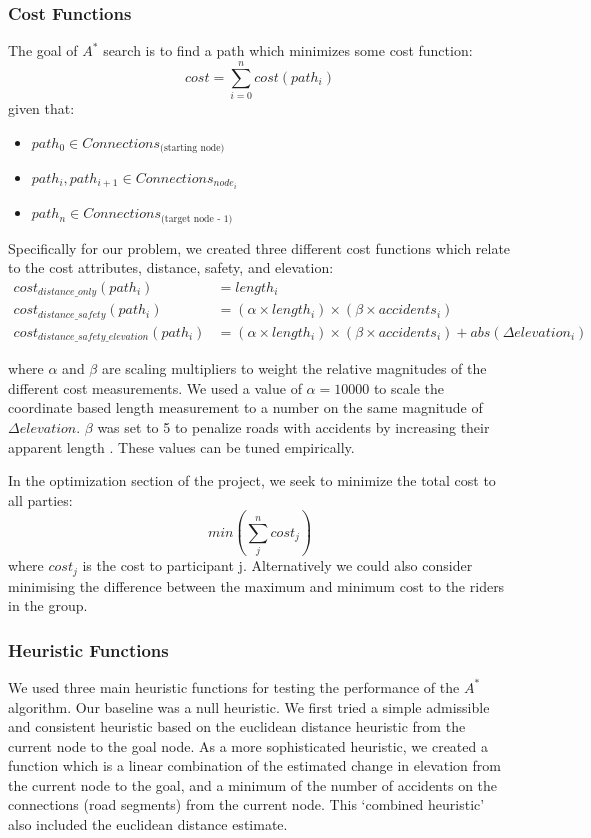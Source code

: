 \documentclass[11pt]{article}
\begin{document}
\subsubsection{Cost Functions}
The goal of $A^{*}$ search is to find a path which minimizes some cost function:
\begin{equation}
cost = \sum_{i=0}^n cost(path_i)
\end{equation}
given that:
\begin{itemize}
\item $path_0 \in Connections_{\text{(starting node)}}$
\item $path_i, path_{i+1} \in Connections_{node_i}$
\item $path_n \in Connections_{\text{(target node - 1)}}$
\end{itemize}

\noindent Specifically for our problem, we created three different cost functions which relate to the cost attributes, distance, safety, and elevation:
\begin{align}\label{cost_fns}
cost_{distance\_only}(path_i) &= length_i \\
cost_{distance\_safety}(path_i) &= (\alpha \times length_i) \times  (\beta \times accidents_i) \\
cost_{distance\_safety\_elevation}(path_i) &= (\alpha \times length_i) \times  (\beta \times accidents_i) + abs(\Delta elevation_i)
\end{align}

\noindent  where $\alpha$ and $\beta$ are scaling multipliers to weight the relative magnitudes of the different cost measurements. We used a value of $\alpha = 10000$ to scale the coordinate based length measurement to a number on the same magnitude of $\Delta elevation$. $\beta$ was set to 5 to penalize roads with accidents by increasing their apparent length . These values can be tuned empirically.\par
\noindent In the optimization section of the project, we seek to minimize the total cost to all parties:
\begin{equation}
min(\sum_j^n cost_j)
\end{equation}
where $cost_j$ is the cost to participant j. Alternatively we could also consider minimising the difference between the maximum and minimum cost to the riders in the group. 

\subsubsection{Heuristic Functions}
We used three main heuristic functions for testing the performance of the $A^{*}$ algorithm. Our baseline was a null heuristic. We first tried a simple admissible and consistent heuristic based on the euclidean distance heuristic from the current node to the goal node. As a more sophisticated heuristic, we created a function which is a linear combination of the estimated change in elevation from the current node to the goal, and a minimum of the number of accidents on the connections (road segments) from the current node. This `combined heuristic' also included the euclidean distance estimate. 
\end{document}
